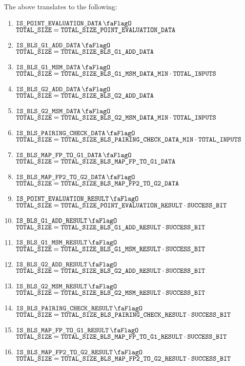 \saNote{} The above translates to the following:
\begin{enumerate}
    \item \If $\isPointEvaluationData$    \Then $\texttt{TOTAL\_SIZE} = \texttt{TOTAL\_SIZE\_POINT\_EVALUATION\_DATA}$
    \item \If $\isBlsGOneAddData$         \Then $\texttt{TOTAL\_SIZE} = \texttt{TOTAL\_SIZE\_BLS\_G1\_ADD\_DATA}$
    \item \If $\isBlsGOneMsmData$         \Then $\texttt{TOTAL\_SIZE} = \texttt{TOTAL\_SIZE\_BLS\_G1\_MSM\_DATA\_MIN} \cdot \texttt{TOTAL\_INPUTS}$
    \item \If $\isBlsGTwoAddData$         \Then $\texttt{TOTAL\_SIZE} = \texttt{TOTAL\_SIZE\_BLS\_G2\_ADD\_DATA}$
    \item \If $\isBlsGTwoMsmData$         \Then $\texttt{TOTAL\_SIZE} = \texttt{TOTAL\_SIZE\_BLS\_G2\_MSM\_DATA\_MIN} \cdot \texttt{TOTAL\_INPUTS}$
    \item \If $\isBlsPairingCheckData$    \Then $\texttt{TOTAL\_SIZE} = \texttt{TOTAL\_SIZE\_BLS\_PAIRING\_CHECK\_DATA\_MIN} \cdot \texttt{TOTAL\_INPUTS}$
    \item \If $\isBlsMapFpToGOneData$     \Then $\texttt{TOTAL\_SIZE} = \texttt{TOTAL\_SIZE\_BLS\_MAP\_FP\_TO\_G1\_DATA}$
    \item \If $\isBlsMapFpTwoToGTwoData$  \Then $\texttt{TOTAL\_SIZE} = \texttt{TOTAL\_SIZE\_BLS\_MAP\_FP2\_TO\_G2\_DATA}$
    \item \If $\isPointEvaluationResult$  \Then $\texttt{TOTAL\_SIZE} = \texttt{TOTAL\_SIZE\_POINT\_EVALUATION\_RESULT} \cdot \texttt{SUCCESS\_BIT}$
    \item \If $\isBlsGOneAddResult$       \Then $\texttt{TOTAL\_SIZE} = \texttt{TOTAL\_SIZE\_BLS\_G1\_ADD\_RESULT} \cdot \texttt{SUCCESS\_BIT}$
    \item \If $\isBlsGOneMsmResult$       \Then $\texttt{TOTAL\_SIZE} = \texttt{TOTAL\_SIZE\_BLS\_G1\_MSM\_RESULT} \cdot \texttt{SUCCESS\_BIT}$
    \item \If $\isBlsGTwoAddResult$       \Then $\texttt{TOTAL\_SIZE} = \texttt{TOTAL\_SIZE\_BLS\_G2\_ADD\_RESULT} \cdot \texttt{SUCCESS\_BIT}$
    \item \If $\isBlsGTwoMsmResult$       \Then $\texttt{TOTAL\_SIZE} = \texttt{TOTAL\_SIZE\_BLS\_G2\_MSM\_RESULT} \cdot \texttt{SUCCESS\_BIT}$
    \item \If $\isBlsPairingCheckResult$  \Then $\texttt{TOTAL\_SIZE} = \texttt{TOTAL\_SIZE\_BLS\_PAIRING\_CHECK\_RESULT} \cdot \texttt{SUCCESS\_BIT}$
    \item \If $\isBlsMapFpToGOneResult$   \Then $\texttt{TOTAL\_SIZE} = \texttt{TOTAL\_SIZE\_BLS\_MAP\_FP\_TO\_G1\_RESULT} \cdot \texttt{SUCCESS\_BIT}$
    \item \If $\isBlsMapFpTwoToGTwoResult$ \Then $\texttt{TOTAL\_SIZE} = \texttt{TOTAL\_SIZE\_BLS\_MAP\_FP2\_TO\_G2\_RESULT} \cdot \texttt{SUCCESS\_BIT}$
\end{enumerate}

